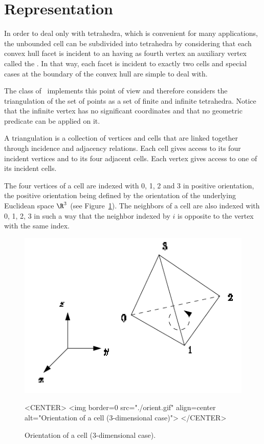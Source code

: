 \section{Representation}
\label{Triangulation3-sec-intro}

In order to deal
only with tetrahedra, which is convenient for many applications, the
unbounded cell can be subdivided into tetrahedra by considering that
each convex hull facet is incident to an  having as
fourth vertex an auxiliary vertex called the .  In
that way, each facet is incident to exactly two cells and special cases
at the boundary of the convex hull are simple to deal with.

The class  of \cgal\ implements this
point of view and therefore considers the triangulation of the set
of points as a set of finite and infinite tetrahedra.  Notice that the
infinite vertex has no significant coordinates and that no
geometric predicate can be applied on it.

A triangulation is a collection of vertices and cells that are linked
together through incidence and adjacency relations. Each cell gives
access to its four incident vertices and to its four adjacent
cells. Each vertex gives access to one of its incident cells.

The four vertices of a cell are indexed with 0, 1, 2 and 3 in positive
orientation, the positive orientation being defined by the orientation
of the underlying Euclidean space $\R^3$ (see
Figure~\ref{Triangulation3-fig-orient}). The neighbors of a cell are also
indexed with 0, 1, 2, 3 in such a way that the neighbor indexed by $i$
is opposite to the vertex with the same index. 

\begin{figure}[htbp]
\begin{ccTexOnly}
\begin{center} 
\includegraphics{Triangulation_3/orient} 
\end{center}
\end{ccTexOnly}
\caption{Orientation of a cell (3-dimensional case).
\label{Triangulation3-fig-orient}}
\begin{ccHtmlOnly}
<CENTER>
<img border=0 src="./orient.gif" align=center alt="Orientation of a cell 
(3-dimensional case)">
</CENTER>
\end{ccHtmlOnly}
\end{figure} 

